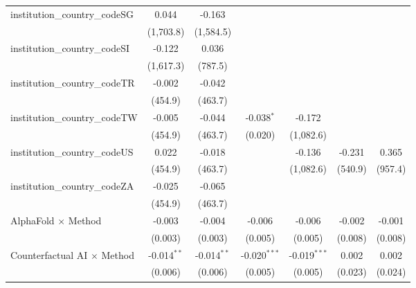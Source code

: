 \begin{tabular}{lcccccc}
   institution\_country\_codeSG          & 0.044         & -0.163        &                &                &           &   \\   
                                         & (1,703.8)     & (1,584.5)     &                &                &           &   \\   
   institution\_country\_codeSI          & -0.122        & 0.036         &                &                &           &   \\   
                                         & (1,617.3)     & (787.5)       &                &                &           &   \\   
   institution\_country\_codeTR          & -0.002        & -0.042        &                &                &           &   \\   
                                         & (454.9)       & (463.7)       &                &                &           &   \\   
   institution\_country\_codeTW          & -0.005        & -0.044        & -0.038$^{*}$   & -0.172         &           &   \\   
                                         & (454.9)       & (463.7)       & (0.020)        & (1,082.6)      &           &   \\   
   institution\_country\_codeUS          & 0.022         & -0.018        &                & -0.136         & -0.231    & 0.365\\   
                                         & (454.9)       & (463.7)       &                & (1,082.6)      & (540.9)   & (957.4)\\   
   institution\_country\_codeZA          & -0.025        & -0.065        &                &                &           &   \\   
                                         & (454.9)       & (463.7)       &                &                &           &   \\   
   AlphaFold $\times$ Method             & -0.003        & -0.004        & -0.006         & -0.006         & -0.002    & -0.001\\   
                                         & (0.003)       & (0.003)       & (0.005)        & (0.005)        & (0.008)   & (0.008)\\   
   Counterfactual AI $\times$ Method     & -0.014$^{**}$ & -0.014$^{**}$ & -0.020$^{***}$ & -0.019$^{***}$ & 0.002     & 0.002\\   
                                         & (0.006)       & (0.006)       & (0.005)        & (0.005)        & (0.023)   & (0.024)\\   

\end{tabular}
